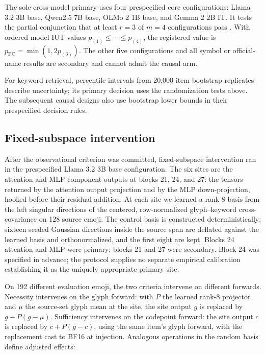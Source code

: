 \documentclass{article}
\begin{document}
The sole cross-model primary uses four prespecified core configurations: Llama 3.2 3B base,
Qwen2.5 7B base, OLMo 2 1B base, and Gemma 2 2B IT. It tests the partial
conjunction that at least $r=3$ of $m=4$ configurations pass
\citep{benjamini2008partial}. With ordered model IUT values
$p_{(1)}\leq\cdots\leq p_{(4)}$, the registered value is
$p_{\mathrm{PC}}=\min(1,2p_{(3)})$. The other five configurations and all symbol or
official-name results are secondary and cannot admit the causal arm.

For keyword retrieval, percentile intervals from 20,000 item-bootstrap
replicates describe uncertainty; its primary decision uses the randomization
tests above. The subsequent causal designs also use bootstrap lower bounds
in their prespecified decision rules.

\subsection{Fixed-subspace intervention}

After the observational criterion was committed, fixed-subspace intervention ran in the
prespecified Llama 3.2 3B base configuration. The six sites are the attention
and MLP component outputs at blocks 21, 24, and 27: the tensors returned by
the attention output projection and by the MLP down-projection, hooked before
their residual addition. At each site we learned a rank-8 basis from the left
singular directions of the centered, row-normalized glyph--keyword
cross-covariance on 128 source emoji. The control basis is constructed
deterministically: sixteen seeded Gaussian directions inside the source
span are deflated against the learned basis and orthonormalized, and the
first eight are kept. Blocks 24 attention and MLP were primary; blocks 21
and 27 were secondary.
Block 24 was specified in advance; the protocol supplies no separate
empirical calibration establishing it as the uniquely appropriate primary site.

On 192 different evaluation emoji, the two criteria intervene on different
forwards. Necessity intervenes on the glyph forward: with $P$ the learned
rank-8 projector and $\mu$ the source-set glyph mean at the site, the site
output $g$ is replaced by $g-P(g-\mu)$. Sufficiency intervenes on the
codepoint forward: the site output $c$ is replaced by $c+P(g-c)$, using the
same item's glyph forward, with the replacement cast to BF16 at injection.
Analogous operations in the random basis define adjusted effects:
\end{document}
